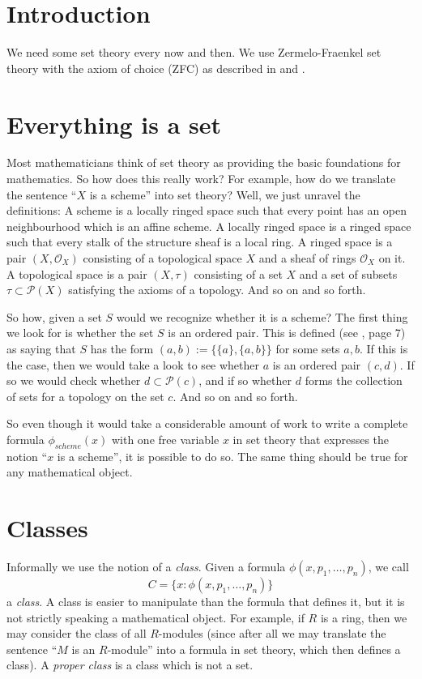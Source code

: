 \section{Introduction}
\label{sets-section-introduction}
We need some set theory every now and then. We use Zermelo-Fraenkel set theory
with the axiom of choice (ZFC) as described in \cite{Kunen} and \cite{Jech}.

\section{Everything is a set}
\label{sets-section-sets-everything}
Most mathematicians think of set theory as providing the basic
foundations for mathematics. So how does this really work?
For example, how do we translate the sentence
``$X$ is a scheme'' into set theory? Well, we just unravel the
definitions: A scheme is a locally ringed space such that every
point has an open neighbourhood which is an affine scheme.
A locally ringed space is a ringed space such that every stalk
of the structure sheaf is a local ring. A ringed space is
a pair $(X, \mathcal{O}_X)$ consisting of a topological space
$X$ and a sheaf of rings $\mathcal{O}_X$ on it. A topological
space is a pair $(X, \tau)$ consisting of a set
$X$ and a set of subsets $\tau \subset \mathcal{P}(X)$
satisfying the axioms of a topology. And so on and
so forth.

\medskip\noindent
So how, given a set $S$ would we recognize whether it is a scheme?
The first thing we look for is whether the set $S$ is an ordered pair.
This is defined (see \cite{Jech}, page 7) as saying that $S$
has the form $(a, b) := \{\{a\}, \{a, b\}\}$ for some sets $a, b$. If this is
the case, then we would take a look to see whether $a$ is an
ordered pair $(c, d)$. If so we would check whether
$d \subset \mathcal{P}(c)$, and if so whether $d$ forms the collection
of sets for a topology on the set $c$. And so on and so forth.

\medskip\noindent
So even though it would take a considerable amount of work to write
a complete formula $\phi_{scheme}(x)$ with one free variable $x$ in set theory
that expresses the notion ``$x$ is a scheme'', it is possible to do so.
The same thing should be true for any mathematical object.

\section{Classes}
\label{sets-section-classes}
Informally we use the notion of a {\it class}. Given a formula
$\phi(x, p_1, \ldots, p_n)$, we call
$$
C = \{x : \phi(x, p_1, \ldots, p_n)\}
$$
a {\it class}. A class is easier to manipulate than the formula
that defines it, but it is not strictly speaking a mathematical
object. For example, if $R$ is a ring, then we may
consider the class of all $R$-modules (since after all we
may translate the sentence ``$M$ is an $R$-module''
into a formula in set theory, which then defines a class).
A {\it proper class} is a class which is not a set.

